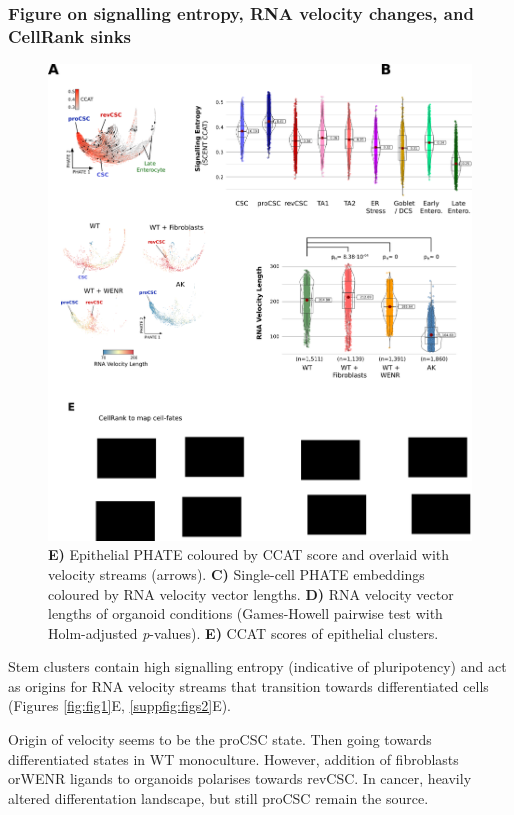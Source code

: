 \subsubsection{Figure on signalling entropy, RNA velocity changes, and CellRank sinks}

\begin{figure}
    \centering
    \includegraphics{04seq/figs/4SEQ_Dynamics.png}
    \caption{\textbf{E)} Epithelial PHATE coloured by CCAT score and overlaid with velocity streams (arrows). \textbf{C)} Single-cell PHATE embeddings coloured by RNA velocity vector lengths. \textbf{D)} RNA velocity vector lengths of organoid conditions (Games-Howell pairwise test with Holm-adjusted \textit{p}-values). \textbf{E)} CCAT scores of epithelial clusters.}
    \label{fig:4dyn}
\end{figure}

Stem clusters contain high signalling entropy (indicative of pluripotency) \cite{teschendorff_singlecell_2017} and act as origins for RNA velocity streams \cite{bergen_generalizing_2020} that transition towards differentiated cells (Figures \ref{fig:fig1}E, \ref{suppfig:figs2}E).

Origin of velocity seems to be the proCSC state. Then going towards differentiated states in WT monoculture. However, addition of fibroblasts orWENR ligands to organoids polarises towards revCSC. In cancer, heavily altered differentation landscape, but still proCSC remain the source.

